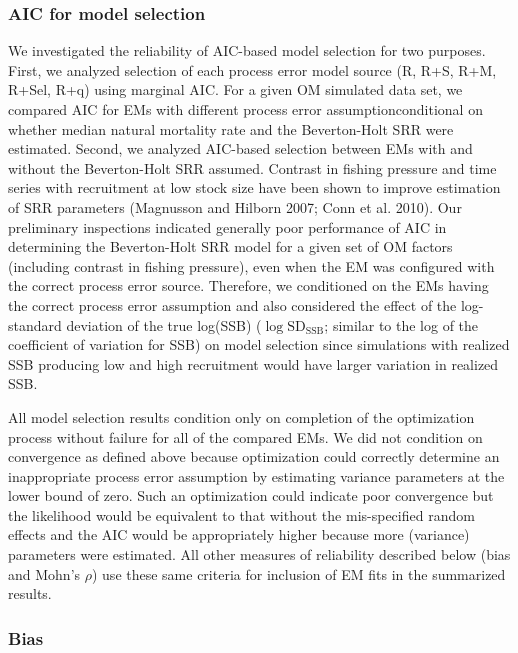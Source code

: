 \documentclass[
  12pt,
]{article}
\providecommand{\DIFadd}[1]{{\protect\color{blue}\uwave{#1}}} %
\providecommand{\DIFaddbegin}{} %
\providecommand{\DIFaddend}{} %
\providecommand{\DIFaddincludegraphics}[2][]{{\color{blue}\fbox{\DIFOincludegraphics[#1]{#2}}}} %
\DeclareRobustCommand{\DIFaddbegin}{\DIFOaddbegin \let\includegraphics\DIFaddincludegraphics} %
\DeclareRobustCommand{\DIFaddend}{\DIFOaddend \let\includegraphics\DIFOincludegraphics} %
\begin{document}
\subsubsection*{AIC for model selection}\label{aic-for-model-selection}

We investigated the reliability of AIC-based model selection for two
purposes. First, we analyzed selection of each process error model
source (R, R+S, R+M, R+Sel, R+q) using marginal AIC. For a given OM
simulated data set, we compared AIC for EMs with different process error
assumption\DIFaddbegin \DIFadd{s}\DIFaddend  conditional on whether median natural mortality rate and the
Beverton-Holt SRR were estimated. Second, we analyzed AIC-based
selection between EMs with and without the Beverton-Holt SRR assumed.
Contrast in fishing pressure and time series with recruitment at low
stock size have been shown to improve estimation of SRR parameters
(Magnusson and Hilborn 2007; Conn et al. 2010). Our preliminary
inspections indicated generally poor performance of AIC in determining
the Beverton-Holt SRR model for a given set of OM factors (including
contrast in fishing pressure), even when the EM was configured with the
correct process error source. Therefore, we conditioned on the EMs
having the correct process error assumption and also considered the
effect of the log-standard deviation of the true log(SSB)
(\(\log \text{SD}_{\text{SSB}}\); similar to the log of the coefficient
of variation for SSB) on model selection since simulations with realized
SSB producing low and high recruitment would have larger variation in
realized SSB.

All model selection results condition only on completion of the
optimization process without failure for all of the compared EMs. We did
not condition on convergence as defined above because optimization could
correctly determine an inappropriate process error assumption by
estimating variance parameters at the lower bound of zero. Such an
optimization could indicate poor convergence but the likelihood would be
equivalent to that without the mis-specified random effects and the AIC
would be appropriately higher because more (variance) parameters were
estimated. All other measures of reliability described below (bias and
Mohn's \(\rho\)) use these same criteria for inclusion of EM fits in the
summarized results.

\subsubsection*{Bias}\label{bias}
\end{document}
